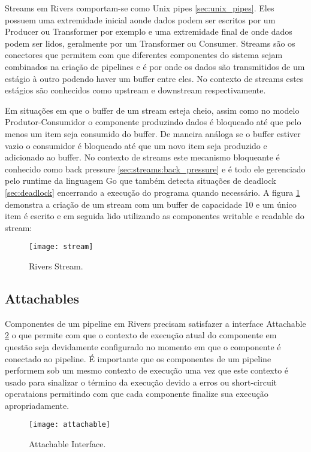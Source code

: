 Streams em Rivers comportam-se como Unix pipes \ref{sec:unix_pipes}. Eles possuem uma extremidade inicial aonde dados podem ser escritos por um Producer ou Transformer por exemplo e uma extremidade final de onde dados podem ser lidos, geralmente por um Transformer ou Consumer. Streams são os conectores que permitem com que diferentes componentes do sistema sejam combinados na criação de pipelines e é por onde os dados são transmitidos de um estágio à outro podendo haver um buffer entre eles. No contexto de streams estes estágios são conhecidos como upstream e downstream respectivamente. 

Em situações em que o buffer de um stream esteja cheio, assim como no modelo Produtor-Consumidor o componente produzindo dados é bloqueado até que pelo menos um item seja consumido do buffer. De maneira análoga se o buffer estiver vazio o consumidor é bloqueado até que um novo item seja produzido e adicionado ao buffer. No contexto de streams este mecanismo bloqueante é conhecido como back pressure \ref{sec:streams:back_pressure} e é todo ele gerenciado pelo runtime da linguagem Go que também detecta situações de deadlock \ref{sec:deadlock} encerrando a execução do programa quando necessário. A figura \ref{code:stream} demonstra a criação de um stream com um buffer de capacidade 10 e um único item é escrito e em seguida lido utilizando as componentes writable e readable do stream:

\begin{figure}[H]
  \texttt{[image: stream]}
  \centering
  \caption{Rivers Stream.}
  \label{code:stream}
\end{figure}

\subsection{Attachables}
\label{sec:rivers:attachable}

Componentes de um pipeline em Rivers precisam satisfazer a interface Attachable \ref{code:rivers:attachable} o que permite com que o contexto de execução atual do componente em questão seja devidamente configurado no momento em que o componente é conectado ao pipeline. É importante que os componentes de um pipeline performem sob um mesmo contexto de execução uma vez que este contexto é usado para sinalizar o término da execução devido a erros ou short-circuit operataions permitindo com que cada componente finalize sua execução apropriadamente.

\begin{figure}[H]
  \texttt{[image: attachable]}
  \centering
  \caption{Attachable Interface.}
  \label{code:rivers:attachable}
\end{figure}

